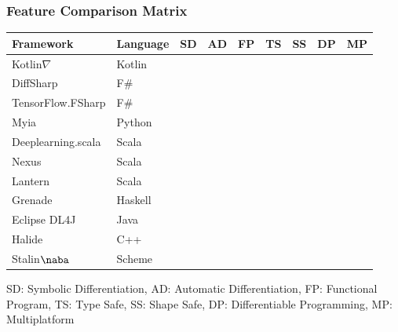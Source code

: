\documentclass{beamer}
\newcommand{\wmark}{\textcolor{orange}{\ding{45}}}
\newcommand{\cmark}{\textcolor{green!80!black}{\ding{51}}}
\newcommand{\xmark}{\textcolor{red}{\ding{55}}}
\begin{document}
\begin{frame}
    \frametitle{Feature Comparison Matrix}
    \begin{center}
\begin{tabular}{lllllllll}
    \textbf{Framework} &
    \textbf{Language} &
    SD &
    AD &
    FP &
    TS &
    SS &
    DP &
    MP
    \\ \hline
Kotlin$\nabla$     & Kotlin  & \cmark & \cmark & \cmark & \cmark & \cmark & \wmark & \wmark \\
DiffSharp          & F\#     & \xmark & \cmark & \cmark & \cmark & \xmark & \cmark & \xmark \\
TensorFlow.FSharp  & F\#     & \xmark & \cmark & \cmark & \cmark & \cmark & \cmark & \xmark \\
Myia               & Python  & \cmark & \cmark & \cmark & \cmark & \cmark & \cmark & \xmark \\
Deeplearning.scala & Scala   & \xmark & \cmark & \cmark & \cmark & \xmark & \cmark & \xmark \\
Nexus              & Scala   & \xmark & \cmark & \cmark & \cmark & \cmark & \cmark & \xmark \\
Lantern            & Scala   & \xmark & \cmark & \cmark & \cmark & \xmark & \cmark & \xmark \\
Grenade            & Haskell & \xmark & \cmark & \cmark & \cmark & \cmark & \xmark & \xmark \\
Eclipse DL4J       & Java    & \xmark & \cmark & \xmark & \cmark & \xmark & \xmark & \xmark \\
Halide             & C++     & \xmark & \cmark & \xmark & \cmark & \xmark & \cmark & \xmark \\
Stalin$\naba$      & Scheme  & \xmark & \cmark & \cmark & \xmark & \xmark & \xmark & \xmark \\
\end{tabular}
\end{center}
\footnotesize{SD: Symbolic Differentiation, AD: Automatic Differentiation, FP: Functional Program, TS: Type Safe, SS: Shape Safe, DP: Differentiable Programming, MP: Multiplatform}
\end{frame}
\end{document}
